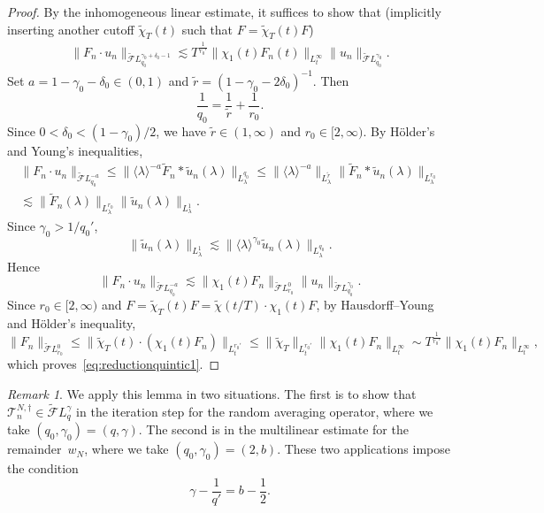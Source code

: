 \documentclass[11pt,reqno,english]{amsart}
\numberwithin{equation}{section}
\theoremstyle{plain}
\theoremstyle{definition}
\theoremstyle{remark}
\newtheorem{remark}[theorem]{Remark}
\begin{document}
\begin{proof}
	By the inhomogeneous linear estimate, it suffices to show that (implicitly inserting another cutoff $\widetilde{\chi}_T(t)$ such that $F=\widetilde{\chi}_T(t)F$)
	\begin{align}\label{eq:reductionquintic1}
		\|F_n\cdot u_n\|_{\widetilde{\mathcal{F}}L_{q_0}^{\gamma_0+\delta_0-1}}
		\lesssim
		T^{\frac{1}{r_0'}}\|\chi_1(t)F_n(t)\|_{L_t^{\infty}}\|u_n\|_{\widetilde{\mathcal{F}}L_{q_0}^{\gamma_0}}.
	\end{align}
	Set $a=1-\gamma_0-\delta_0\in (0,1)$ and $\widetilde{r}=(1-\gamma_0-2\delta_0)^{-1}$. Then
	\[
	\frac{1}{q_0}=\frac{1}{\widetilde{r}}+\frac{1}{r_0}.
	\]
	Since $0<\delta_0<(1-\gamma_0)/2$, we have $\widetilde{r}\in(1,\infty)$ and $r_0\in[2,\infty)$. By H\"older's and Young's inequalities,
\begin{multline*}
		\|F_n\cdot u_n\|_{\widetilde{\mathcal{F}}L_{q_0}^{-a}}
		\leq
		\|\langle\lambda\rangle^{-a} \widetilde{F}_n\ast \widetilde{u}_n(\lambda)\|_{L_{\lambda}^{q_0}}
		\leq
		\|\langle\lambda\rangle^{-a}\|_{L_{\lambda}^{\widetilde{r}}}\|\widetilde{F}_n\ast\widetilde{u}_n(\lambda)\|_{L_{\lambda}^{r_0}}\\
		\lesssim
		\|\widetilde{F}_n(\lambda)\|_{L_{\lambda}^{r_0}}
		\|\widetilde{u}_n(\lambda)\|_{L_{\lambda}^{1}}.
\end{multline*}
	Since $\gamma_0>1/q_0'$,
	\[
	\|\widetilde{u}_n(\lambda)\|_{L_{\lambda}^1}
	\lesssim
	\|\langle\lambda\rangle^{\gamma_0}\widetilde{u}_n(\lambda)\|_{L_{\lambda}^{q_0}}.
	\]
	Hence
	\[
	\|F_n\cdot u_n\|_{\widetilde{\mathcal{F}}L_{q_0}^{-a}}
	\lesssim
	\|\chi_1(t)F_n\|_{\widetilde{\mathcal{F}}L_{r_0}^{0}}\|u_n\|_{\widetilde{\mathcal{F}}L_{q_0}^{\gamma_0}}.
	\]
	Since $r_0\in[2,\infty)$ and $F=\widetilde{\chi}_T(t)F=\widetilde{\chi}(t/T)\cdot\chi_1(t)F$, by Hausdorff--Young and H\"older's inequality,
	\[
		\|F_n\|_{\widetilde{\mathcal{F}}L_{r_0}^0}
		\leq
		\|\widetilde{\chi}_T(t)\cdot (\chi_1(t) F_n)\|_{L_t^{r_0'}}
		\leq
		\|\widetilde{\chi}_T\|_{L_t^{r_0'}}\|\chi_1(t)F_n\|_{L_t^{\infty}}
		\sim
		T^{\frac{1}{r_0'}}\|\chi_1(t)F_n\|_{L_t^{\infty}},
	\]
	which proves~\eqref{eq:reductionquintic1}.
\end{proof}

\begin{remark}
	We apply this lemma in two situations. The first is to show that $\mathcal{T}_n^{N,\dag}\in \widetilde{\mathcal{F}}L_q^{\gamma}$ in the iteration step for the random averaging operator, where we take $(q_0,\gamma_0)=(q,\gamma)$. The second is in the multilinear estimate for the remainder~$w_N$, where we take $(q_0,\gamma_0)=(2,b)$. These two applications impose the condition
	\[
	\gamma-\frac{1}{q'}=b-\frac{1}{2}.
	\]
\end{remark}
\end{document}

